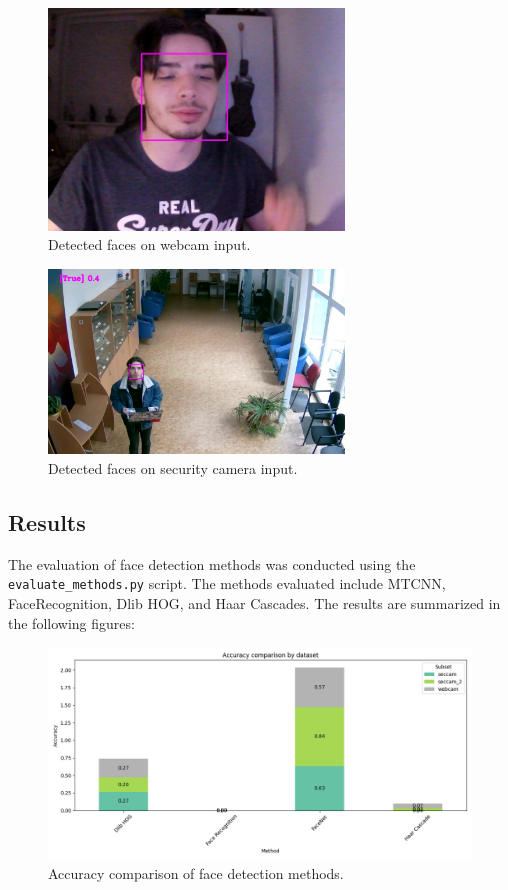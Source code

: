 \begin{figure}[ht!]
    \centering
    \includegraphics[width=0.7\textwidth]{../Files/webcam_result.jpg}
    \caption{Detected faces on webcam input.}
    \label{fig:webcam-result}
\end{figure}

\begin{figure}[ht!]
    \centering
    \includegraphics[width=0.7\textwidth]{../Files/seccam_result.jpg}
    \caption{Detected faces on security camera input.}
    \label{fig:seccam-result}
\end{figure}

\subsection{Results}

The evaluation of face detection methods was conducted using the \texttt{evaluate\_methods.py} script. The methods evaluated include MTCNN, FaceRecognition, Dlib HOG, and Haar Cascades. The results are summarized in the following figures:

\begin{figure}[ht!]
    \centering
    \includegraphics[width=\textwidth]{../Files/Accuracy.png}
    \caption{Accuracy comparison of face detection methods.}
    \label{fig:accuracy-comparison}
\end{figure}


